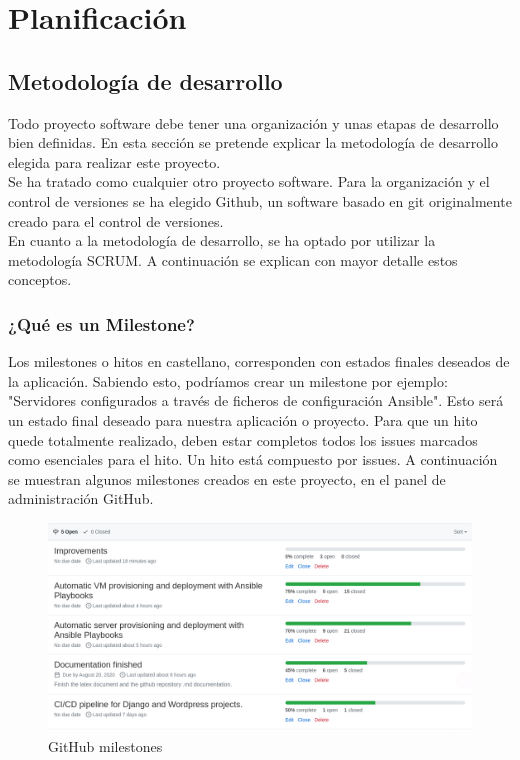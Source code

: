 \chapter {Planificación}

\section{Metodología de desarrollo}
\begin{text}
	Todo proyecto software debe tener una organización y unas etapas de desarrollo bien definidas. En esta sección se pretende explicar la metodología de desarrollo elegida para realizar este proyecto. \\
	Se ha tratado como cualquier otro proyecto software. Para la organización y el control de versiones se ha elegido Github, un software basado en git originalmente creado para el control de versiones. \\
	En cuanto a la metodología de desarrollo, se ha optado por utilizar la metodología SCRUM. A continuación se explican con mayor detalle estos conceptos.
\end{text}

\subsection{¿Qué es un Milestone?}
\label{milestones}
\begin{text}
	Los milestones o hitos en castellano, corresponden con estados finales deseados de la aplicación. Sabiendo esto, podríamos crear un milestone por ejemplo: "Servidores configurados a través de ficheros de configuración Ansible". Esto será un estado final deseado para nuestra aplicación o proyecto. Para que un hito quede totalmente realizado, deben estar completos todos los issues marcados como esenciales para el hito. Un hito está compuesto por issues. A continuación se muestran algunos milestones creados en este proyecto, en el panel de administración GitHub.
	
	\clearpage
	
	\begin{figure}[!hbt]
		\centering
		\includegraphics[scale=0.37]{imagenes/Analisis/milestones.png}
		\caption[GitHub milestones]{GitHub milestones \cite{github-issue}}
		\label{github_milestones}
	\end{figure}
\end{text}

